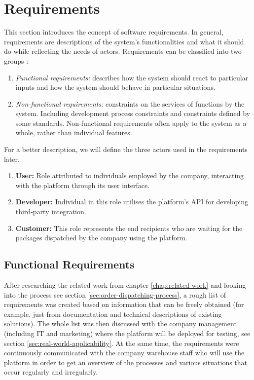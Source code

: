 \section{Requirements}
\label{sec:requirements}
This section introduces the concept of software requirements.
In general, requirements are descriptions of the system's functionalities and what it should do while reflecting the needs of actors.
Requirements can be classified into two groups \cite{sommervilleSW}:
\begin{enumerate}
    \item \textit{Functional requirements:} describes how the system should react to particular inputs and how the system should behave in particular situations.
    \item \textit{Non-functional requirements:} constraints on the services of functions by the system. Including development process constraints and constraints defined by some standards. Non-functional requirements often apply to the system as a whole, rather than individual features.
\end{enumerate}
For a better description, we will define the three actors used in the requirements later.
\begin{enumerate}
    \item \textbf{User:} Role attributed to individuals employed by the company, interacting with the platform through its user interface. 
    \item \textbf{Developer:} Individual in this role utilises the platform's API for developing third-party integration.
    \item \textbf{Customer:} This role represents the end recipients who are waiting for the packages dispatched by the company using the platform.
\end{enumerate}

\subsection{Functional Requirements}
\label{subsec:functional-requirements}
After researching the related work from chapter \ref{chap:related-work} and looking into the process see section \ref{sec:order-dispatching-process}, a rough list of requirements was created based on information that can be freely obtained (for example, just from documentation and technical descriptions of existing solutions).
The whole list was then discussed with the company management (including IT and marketing) where the platform will be deployed for testing, see section \ref{sec:real-world-applicability}. 
At the same time, the requirements were continuously communicated with the company warehouse staff who will use the platform in order to get an overview of the processes and various situations that occur regularly and irregularly.

